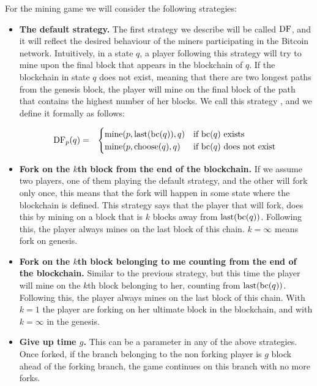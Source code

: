 For the mining game we will consider the following strategies:
\begin{itemize}
\item {\bf The default strategy.}  The first strategy we describe will be called $\text{\rm DF}$, and it will reflect the desired behaviour of the miners participating in the Bitcoin network. Intuitively, in a state $q$, a player following this strategy will try to mine upon the final block that appears in the blockchain of $q$. If the blockchain in state $q$ does not exist, meaning that there are two longest paths from the genesis block, the player will mine on the final block of the path that contains the highest number of her blocks. We call this strategy \df, and we define it formally as follows:

\begin{eqnarray*}
\text{\rm DF}_p(q) & = &
\begin{cases}
\text{\rm mine}(p,\text{\rm last}(\text{bc}(q)),q) & \text{if } \text{bc}(q) \text{ exists }\\
\text{\rm mine}(p,\text{\rm choose}(q),q) & \text{if } \text{bc}(q) \text{ does not exist }
\end{cases}
\end{eqnarray*}


\item {\bf Fork on the $k$th block from the end of the blockchain.} If we assume two players, one of them playing the default strategy, and the other will fork only once, this means that the fork will happen in some state where the blockchain is defined. This strategy says that the player that will fork, does this by mining on a block that is $k$ blocks away from $\text{\rm last}(\text{bc}(q))$. Following this, the player always mines on the last block of this chain. $k=\infty$ means fork on genesis. 

\item {\bf Fork on the $k$th block belonging to me counting from the end of the blockchain.} Similar to the previous strategy, but this time the player will mine on the $k$th block belonging to her, counting from $\text{\rm last}(\text{bc}(q))$. Following this, the player always mines on the last block of this chain. With $k=1$ the player are forking on her ultimate block in the blockchain, and with $k=\infty$ in the genesis.

\item {\bf Give up time $g$.} This can be a parameter in any of the above strategies. Once forked, if the branch belonging to the non forking player is $g$ block ahead of the forking branch, the game continues on this branch with no more forks.
\end{itemize}


